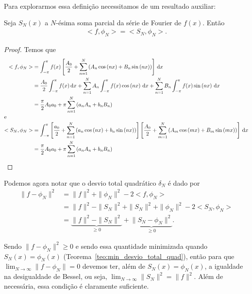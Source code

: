Para explorarmos essa defini\c{c}\~{a}o necessitamos de um resultado auxiliar:
\begin{lem}
    Seja $S_N(x)$ a $N$-\'{e}sima soma parcial da s\'{e}rie de Fourier de $f(x)$. Ent\~{a}o
    \begin{align*}
        <f, \phi_N> = <S_N, \phi_N>.
    \end{align*}
\end{lem}
\begin{proof}
    Temos que
    \begin{align*}
        <f, \phi_N> &= \int_{-\pi}^\pi f(x) \left[ \frac{A_0}{2} + \sum_{n = 1}^N \left( A_n \cos\left( n x \right) + B_n \sin\left( n x \right) \right) \right] \, \mathrm{d}x \\
        &= \frac{A_0}{2} \int_{-\pi}^\pi f(x) \, \mathrm{d}x + \sum_{n = 1}^N A_n \int_{-\pi}^\pi f(x) \cos\left( n x \right) \, \mathrm{d}x + \sum_{n = 1}^N B_n \int_{-\pi}^\pi f(x) \sin\left( n x \right) \, \mathrm{d}x \\
        &= \frac{\pi}{2} A_0 a_0 + \pi \sum_{n = 1}^N \left( a_n A_n + b_n B_n \right) \\
        \intertext{e}
        <S_N, \phi_N> &= \int_{-\pi}^\pi \left[ \frac{a_0}{2} + \sum_{n = 1}^N \left( a_n \cos\left( n x \right) + b_n \sin\left( n x \right) \right) \right] \left[ \frac{A_0}{2} + \sum_{m = 1}^N \left( A_m \cos\left( m x \right) + B_m \sin\left( m x \right) \right) \right] \, \mathrm{d}x \\
        &= \frac{\pi}{2} A_0 a_0 + \pi \sum_{n =1}^N\left( a_n A_n + b_n B_n \right) \qedhere
    \end{align*}
\end{proof}

Podemos agora notar que o desvio total quadr\'{a}tico $\delta_N$ \'{e} dado por
\begin{align*}
    \| f - \phi_N \|^2 &= \| f \|^2 + \| \phi_N \|^2 - 2 <f, \phi_N> \\
    &= \| f \|^2 - \| S_N \|^2 + \| S_N \|^2 + \| \phi_N \|^2 - 2 <S_N, \phi_N> \\
    &= \underbrace{\| f \|^2 - \| S_N \|^2}_{\geq 0} + \underbrace{\| S_N - \phi_N \|^2}_{\geq 0}.
\end{align*}

Sendo $\| f - \phi_N \|^2 \geq 0$ e sendo essa quantidade minimizada quando $S_N(x) = \phi_N(x)$ (Teorema~\ref{teo:min_desvio_total_quad}), ent\~{a}o para que $\lim_{N \to \infty} \| f - \phi_N \| = 0$ devemos ter, al\'{e}m de $S_N(x) = \phi_N(x)$, a igualdade na desigualdade de Bessel, ou seja, $\lim_{N \to \infty} \| S_N \|^2 = \| f \|^2$. Al\'{e}m de necess\'{a}ria, essa condi\c{c}\~{a}o \'{e} claramente suficiente.

